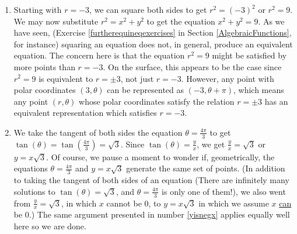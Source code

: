 {\begin{enumerate}
\begin{enumerate}

\item Starting with $r = -3$, we can square both sides to get  $r^2 = (-3)^2$ or $r^2 = 9$.  We may now substitute $r^2 = x^2+y^2$ to get the equation $x^2+y^2 = 9$.  As we have seen, (Exercise \ref{furtherequineqexercises} in Section \ref{AlgebraicFunctions}, for instance) squaring an equation does not, in general, produce an equivalent equation.  The concern here is that the equation $r^2 = 9$ might be satisfied by more points than $r = -3$.  On the surface, this appears to be the case since $r^2 = 9$ is equivalent to $r = \pm 3$, not just $r=-3$.  However, any point with polar coordinates $(3,\theta)$ can be represented as $(-3,\theta + \pi)$, which means any point $(r,\theta)$ whose polar coordinates satisfy the relation $r = \pm 3$ has an equivalent representation which satisfies $r=-3$.


\item  We take the tangent of both sides the equation $\theta = \frac{4\pi}{3}$ to get $\tan(\theta) = \tan\left(\frac{4\pi}{3}\right) = \sqrt{3}$.  Since $\tan(\theta) = \frac{y}{x}$, we get $\frac{y}{x} = \sqrt{3}$ or $y = x\sqrt{3}$.  Of course, we pause a moment to wonder if, geometrically, the equations $\theta = \frac{4\pi}{3}$ and $y = x\sqrt{3}$ generate the same set of points. (In addition to taking the tangent of both sides of an equation (There are infinitely many solutions to $\tan(\theta) = \sqrt{3}$, and $\theta = \frac{4\pi}{3}$ is only one of them!), we also went from $\frac{y}{x} = \sqrt{3}$, in which $x$ cannot be $0$, to $y = x\sqrt{3}$ in which we assume $x$ \underline{can} be $0$.)  The same argument presented in number \ref{yisnegx} applies equally well here so we are done.


\end{enumerate}
\end{enumerate}}
